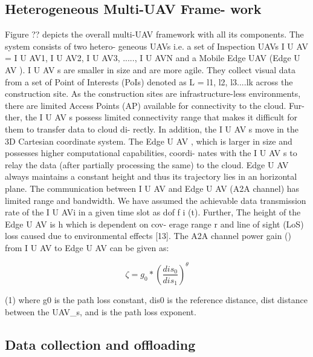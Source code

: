 \documentclass{article}
\begin{document}
\begin{multicols}{2}
\section{Heterogeneous Multi-UAV Frame-
work}
Figure ?? depicts the overall multi-UAV framework with
all its components. The system consists of two hetero-
geneous UAVs i.e. a set of Inspection UAVs I U AV =
{I U AV1, I U AV2, I U AV3, ....., I U AVN } and a Mobile
Edge UAV (Edge U AV ). I U AV s are smaller in size and
are more agile. They collect visual data from a set of
Point of Interests (PoIs) denoted as L = {l1, l2, l3....lk}
across the construction site. As the construction sites are
infrastructure-less environments, there are limited Access
Points (AP) available for connectivity to the cloud. Fur-
ther, the I U AV s possess limited connectivity range that
makes it difficult for them to transfer data to cloud di-
rectly. In addition, the I U AV s move in the 3D Cartesian
coordinate system. The Edge U AV , which is larger in size
and possesses higher computational capabilities, coordi-
nates with the I U AV s to relay the data (after partially
processing the same) to the cloud. Edge U AV always
maintains a constant height and thus its trajectory lies in
an horizontal plane.
The communication between I U AV and Edge U AV
(A2A channel) has limited range and bandwidth. We
have assumed the achievable data transmission rate of
the I U AVi in a given time slot as dof f
i (t). Further, The
height of the Edge U AV is h which is dependent on cov-
erage range r and line of sight (LoS) loss caused due to
environmental effects [13].
The A2A channel power gain (\zeta) from I U AV to
Edge U AV can be given as:

$$ \zeta = g_0*(\frac{dis_0}{dis_1})^\theta $$

 (1)
where g0 is the path loss constant, dis0 is the reference
distance, dist distance between the UAV_s, and \theta is the
path loss exponent.


\subsection{Data collection and offloading}


\end{multicols}
\end{document}
